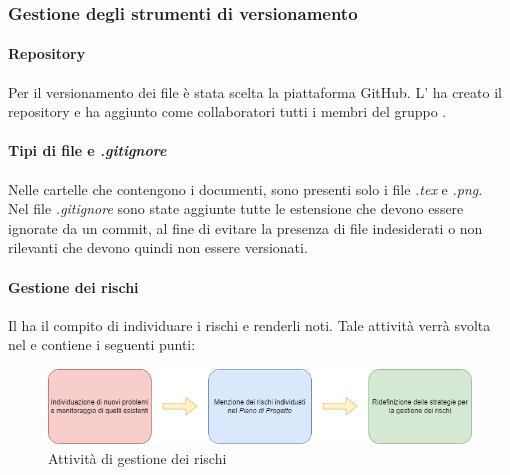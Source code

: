 \subsubsection{Gestione degli strumenti di versionamento}
\paragraph{Repository}
Per il versionamento dei file è stata scelta la piattaforma GitHub\glo{}. L'\roleAdministratorLow{} ha creato il repository\glo{} e ha aggiunto
come collaboratori tutti i membri del gruppo \groupName{}.

\paragraph{Tipi di file e \textit{.gitignore}}
Nelle cartelle che contengono i documenti, sono presenti solo i file \textit{.tex} e \textit{.png}.\\
Nel file \textit{.gitignore} sono state aggiunte tutte le estensione che devono essere ignorate da un commit, al fine di evitare la presenza di file indesiderati
o non rilevanti che devono quindi non essere versionati.
\paragraph {Gestione dei rischi}
Il \roleProjectManagerLow{} ha il compito di individuare i rischi e renderli noti. Tale attività verrà svolta nel \docNamePdPLow{} e contiene i seguenti punti:
\begin{figure}[htbp]
\centering
\includegraphics[scale =0.65]{../template/images/NdP/GestioneRischi.png}
\caption{Attività di gestione dei rischi}
\end {figure}

